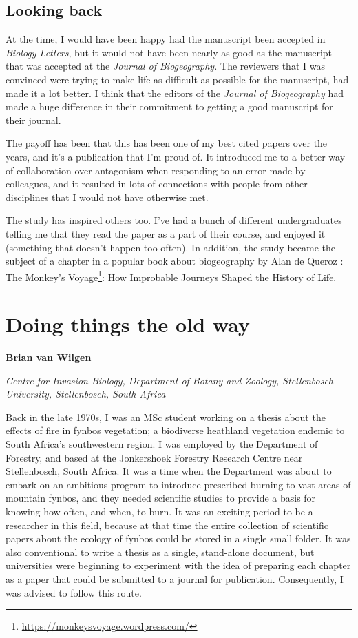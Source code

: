 \documentclass[
]{krantz}
\renewcommand{\href}[2]{#2\footnote{\url{#1}}}
\begin{document}
\hypertarget{looking-back}{%
\section{Looking back}\label{looking-back}}

At the time, I would have been happy had the manuscript been accepted in \emph{Biology Letters}, but it would not have been nearly as good as the manuscript that was accepted at the \emph{Journal of Biogeography.} The reviewers that I was convinced were trying to make life as difficult as possible for the manuscript, had made it a lot better. I think that the editors of the \emph{Journal of Biogeography} had made a huge difference in their commitment to getting a good manuscript for their journal.

The payoff has been that this has been one of my best cited papers over the years, and it's a publication that I'm proud of. It introduced me to a better way of collaboration over antagonism when responding to an error made by colleagues, and it resulted in lots of connections with people from other disciplines that I would not have otherwise met.

The study has inspired others too. I've had a bunch of different undergraduates telling me that they read the paper as a part of their course, and enjoyed it (something that doesn't happen too often). In addition, the study became the subject of a chapter in a popular book about biogeography by Alan de Queroz \citeyearpar{dequeiroz2014monkey}: \href{https://monkeysvoyage.wordpress.com/}{The Monkey's Voyage}: How Improbable Journeys Shaped the History of Life.

\hypertarget{doing-things-the-old-way}{%
\chapter{Doing things the old way}\label{doing-things-the-old-way}}

\textbf{Brian van Wilgen}

\emph{Centre for Invasion Biology, Department of Botany and Zoology, Stellenbosch University, Stellenbosch, South Africa}

Back in the late 1970s, I was an MSc student working on a thesis about the effects of fire in fynbos vegetation; a biodiverse heathland vegetation endemic to South Africa's southwestern region. I was employed by the Department of Forestry, and based at the Jonkershoek Forestry Research Centre near Stellenbosch, South Africa. It was a time when the Department was about to embark on an ambitious program to introduce prescribed burning to vast areas of mountain fynbos, and they needed scientific studies to provide a basis for knowing how often, and when, to burn. It was an exciting period to be a researcher in this field, because at that time the entire collection of scientific papers about the ecology of fynbos could be stored in a single small folder. It was also conventional to write a thesis as a single, stand-alone document, but universities were beginning to experiment with the idea of preparing each chapter as a paper that could be submitted to a journal for publication. Consequently, I was advised to follow this route.
\end{document}
